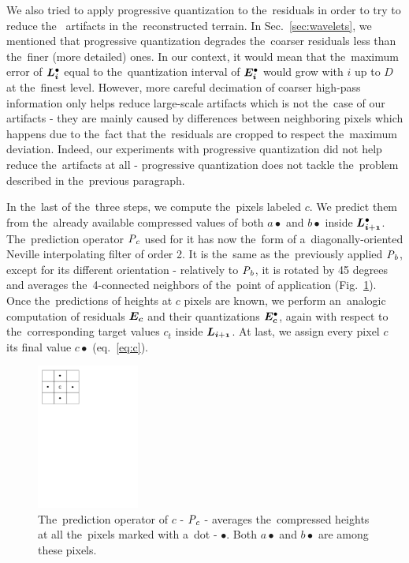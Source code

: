 We also tried to apply progressive quantization to the~residuals in order to try to reduce the~ artifacts in the~reconstructed terrain. In Sec.~\ref{sec:wavelets}, we mentioned that progressive quantization degrades the~coarser residuals less than the~finer (more detailed) ones. In our context, it would mean that the~maximum error of $\objdot{L}{i}$ equal to the~quantization interval of $\objdot{E}{i}$ would grow with $i$ up to $D$ at the~finest level. However, more careful decimation of coarser high-pass information only helps reduce large-scale artifacts which is not the~case of our artifacts - they are mainly caused by differences between neighboring pixels which happens due to the~fact that the~residuals are cropped to respect the~maximum deviation. Indeed, our experiments with progressive quantization did not help reduce the~artifacts at all - progressive quantization does not tackle the~problem described in the~previous paragraph.

In the~last of the~three steps, we compute the~pixels labeled $c$. We predict them from the~already available compressed values of both $a\bullet$ and $b\bullet$ inside $\ldot{i+1}$. The~prediction operator $\mathit{P_{c}}$ used for it has now the~form of a~diagonally-oriented Neville interpolating filter of order 2. It is the~same as the~previously applied $\mathit{P_{b}}$, except for its different orientation - relatively to $\mathit{P_{b}}$, it is rotated by 45 degrees and averages the~4-connected neighbors of the~point of application (Fig.~\ref{fig:ccomp}). Once the~predictions of heights at $c$ pixels are known, we perform an~analogic computation of residuals $\objnorm{E}{c}$ and their quantizations $\objdot{E}{c}$, again with respect to the~corresponding target values $c_t$ inside $\lnorm{i+1}$. At last, we assign every pixel $c$ its final value $c\bullet$ (eq.~\ref{eq:c}).

\begin{figure}
	\includegraphics[trim={0 21cm 10cm 0}, clip, width=0.3\textwidth]{figures/ccomp.pdf}\centering
	\caption{The~prediction operator of $c$ - $\mathit{P_{c}}$ - averages the~compressed heights at all the~pixels marked with a~dot - $\bullet$. Both $a\bullet$ and $b\bullet$ are among these pixels.}
	\label{fig:ccomp}
\end{figure}

